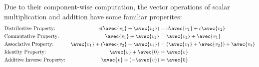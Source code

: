 \documentclass[handout]{ximera}
\begin{document}
Due to their component-wise computation, the vector operations of scalar multiplication and addition have some familiar properites:
\begin{align*}
&\text{Distributive Property:} & c(\avec{v_1} + \avec{v_2}) &= c\avec{v_1} + c\avec{v_2}   \\
& \text{Commutative Property:}& \avec{v_1} + \avec{v_2} &= \avec{v_2} + \avec{v_1} \\
& \text{Associative Property:}&  \avec{v_1} + (\avec{v_2}+ \avec{v_3}) &=  (\avec{v_1} + \avec{v_2}) + \avec{v_3} \\
&\text{Identity Property:} & \avec{v} + \avec{0} &= \avec{v} \\
& \text{Additive Inverse Property:} & \avec{v} + (-\avec{v}) &= \avec{0} 
\end{align*}
\end{document}
